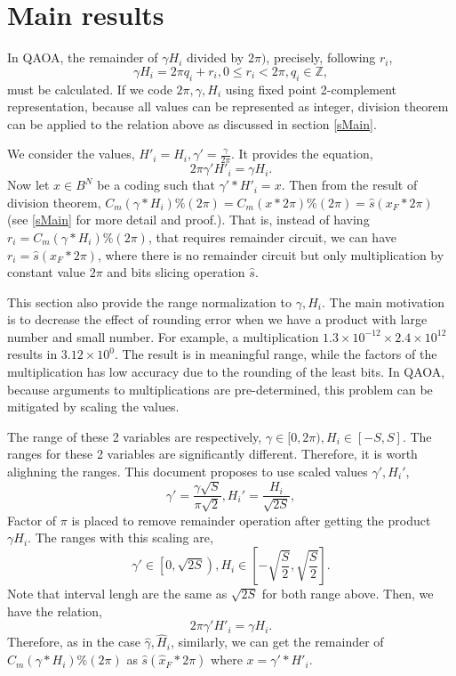 \documentclass[a4paper]{article}
\newcommand{\eqlabel}[1]{\label{#1}\tag{#1}}
\newcommand{\sbr}[1]{\left[#1\right]}
\newcommand{\sZ}{\mathbb{Z}}
\newcommand{\hx}{{\hat{x}}}
\newcommand{\hs}{{\hat{s}}}
\begin{document}
\section{Main results}
In QAOA, the remainder of \(\gamma H_i\) divided by \(2\pi)\), precisely, following \(r_i\),
\[
    \gamma H_i = 2\pi q_i + r_i, 0\leq r_i < 2\pi, q_i\in \sZ,
\]
must be calculated. If we code \(2\pi, \gamma, H_i\) using fixed point 2-complement representation, because all values can be represented as integer, division theorem can be applied to the relation above as discussed in section \ref{sMain}.

We consider the values, \(H'_i =  H_i,  \gamma' = \frac{\gamma}{2\pi}\). It provides the equation,
\[
2\pi \gamma' H'_i = \gamma H_i.
\]
Now let \(x\in B^N\) be a coding such that \(\gamma' * H'_i = x\). Then from the result of division theorem, \(C_m(\gamma*H_i)\% (2\pi) = C_m(x*2\pi)\% (2\pi) =\hs(x_F * 2\pi)\) (see \ref{sMain} for more detail and proof.). That is, instead of having \(r_i = C_m(\gamma *H_i)\% (2\pi) \), that requires remainder circuit, we can have \(r_i = \hs(x_F * 2\pi)\), where there is no remainder circuit but only multiplication by constant value \(2\pi\) and bits slicing operation \(\hs\).

This section also provide the range normalization to  \(\gamma, H_i\). The main motivation is to decrease the effect of rounding error when we have a product with large number and small number. For example, a multiplication \(1.3\times 10^{-12} \times 2.4 \times 10^{12}\) results in \(3.12\times 10^{0}\). The result is in meaningful range, while the factors of the multiplication has low accuracy due to the rounding of the least bits. In QAOA, because arguments to multiplications are pre-determined, this problem can be mitigated by scaling the values.

The range of these 2 variables are respectively, \(\gamma\in [0, 2\pi), H_i\in [-S, S]\). The ranges for these 2 variables are significantly different. Therefore, it is worth alighning the ranges. This document proposes to use scaled values \(\gamma', H_i'\),
\begin{equation}
    \eqlabel{eNormGM}
    \gamma' = \frac{\gamma \sqrt{S}}{\pi\sqrt{2}}, H_i' =  \frac{H_i}{\sqrt{2S}}, 
\end{equation}
Factor of \(\pi\) is placed to remove remainder operation after getting the product \(\gamma H_i\). The ranges with this scaling are,
\[
 \gamma'\in \left [0, \sqrt{2S}\right ), H_i\in \sbr{-\sqrt{\frac{S}{2}}, \sqrt{\frac{S}{2}}}.
\]
Note that interval lengh are the same as \(\sqrt{2S}\) for both range above. Then, we have the relation,
\[
    2\pi \gamma' H'_i = \gamma H_i.
\]
Therefore, as in the case \(\hat{\gamma}, \hat{H}_i\), similarly, we can get the remainder of \(C_m(\gamma * H_i)\% (2\pi)\) as \(\hs(\hx_F*2\pi)\) where \(x = \gamma' * H'_i\).
 
\end{document}
